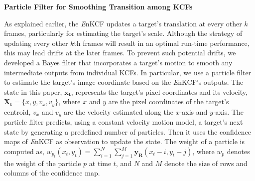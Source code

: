 \documentclass[10pt,twocolumn,letterpaper]{article}
\begin{document}
\textbf{Particle Filter for Smoothing Transition among KCFs}

As explained earlier, the {\it E}nKCF updates a target's translation
at every other $k$ frames, particularly for estimating the target's
scale. Although the strategy of updating every other $k$th frames will
result in an optimal run-time performance, this may lead drifts at the
later frames. To prevent such potential drifts, we developed a Bayes
filter that incorporates a target's motion to smooth any intermediate
outputs from individual KCFs. In particular, we use a particle filter
to estimate the target's image coordinate based on the {\it E}nKCF's
outputs. The state in this paper, $\mathbf{x_t}$, represents the
target's pixel coordinates and its velocity, $\mathbf{X_t} = \lbrace
x, y, v_{x}, v_{y} \rbrace$, where $x$ and $y$ are the pixel
coordinates of the target's centroid, $v_x$ and $v_y$ are the velocity
estimated along the $x$-axis and $y$-axis. The particle filter
predicts, using a constant velocity motion model, a target's next
state by generating a predefined number of particles. Then it uses the
confidence maps of {\it E}nKCF as observation to update the state. The
weight of a particle is computed as, $w_{p_{t}}(x_{t},y_{t}) =
\sum_{i=1}^{N}\sum_{j=1}^{M} \mathbf{y_{R}}(x_{t}-i,y_{t}-j)$, where
$w_{p}$ denotes the weight of the particle $p$ at time $t$, and $N$
and $M$ denote the size of rows and columns of the confidence map.
\end{document}
